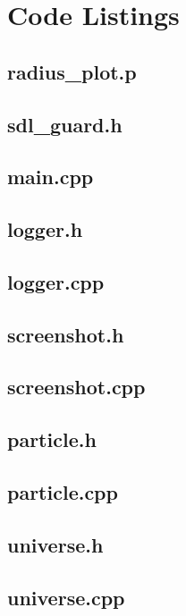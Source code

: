 \documentclass[10pt,a4paper]{article}
\begin{document}
\clearpage
{}
\section{Code Listings}
\subsection{radius\_plot.p}

\subsection{sdl\_guard.h}

\clearpage
\subsection{main.cpp}

\clearpage
\subsection{logger.h}

\subsection{logger.cpp}

\clearpage
\subsection{screenshot.h}

\subsection{screenshot.cpp}

\clearpage
\subsection{particle.h}

\subsection{particle.cpp}

\clearpage
\subsection{universe.h}

\subsection{universe.cpp}

\clearpage
\end{document}
